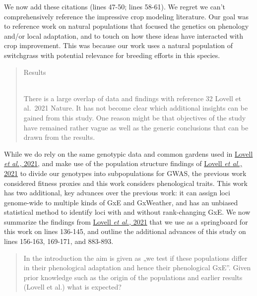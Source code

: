 \documentclass[
  letterpaper,
  DIV=11,
  numbers=noendperiod]{scrartcl}
\begin{document}
We now add these citations (lines 47-50; lines 58-61). We regret we
can't comprehensively reference the impressive crop modeling literature.
Our goal was to reference work on natural populations that focused the
genetics on phenology and/or local adaptation, and to touch on how these
ideas have interacted with crop improvement. This was because our work
uses a natural population of switchgrass with potential relevance for
breeding efforts in this species.

\begin{quote}
\begin{tcolorbox}[enhanced jigsaw, colframe=quarto-callout-warning-color-frame, rightrule=.15mm, leftrule=.75mm, left=2mm, breakable, toprule=.15mm, arc=.35mm, bottomrule=.15mm, opacityback=0, colback=white]

Results\\
\strut \\
There is a large overlap of data and findings with reference 32 Lovell
et al.~2021 Nature. It has not become clear which additional insights
can be gained from this study. One reason might be that objectives of
the study have remained rather vague as well as the generic conclusions
that can be drawn from the results.

\end{tcolorbox}
\end{quote}

While we do rely on the same genotypic data and common gardens used in
\href{https://doi.org/10.1038/s41586-020-03127-1}{Lovell \emph{et al.,}
2021}, and make use of the population structure findings of
\href{https://doi.org/10.1038/s41586-020-03127-1}{Lovell \emph{et al.,}
2021} to divide our genotypes into subpopulations for GWAS, the previous
work considered fitness proxies and this work considers phenological
traits. This work has two additional, key advances over the previous
work: it can assign loci genome-wide to multiple kinds of GxE and
GxWeather, and has an unbiased statistical method to identify loci with
and without rank-changing GxE. We now summarize the findings from
\href{https://doi.org/10.1038/s41586-020-03127-1}{Lovell \emph{et al.,}
2021} that we use as a springboard for this work on lines 136-145, and
outline the additional advances of this study on lines 156-163, 169-171,
and 883-893.

\begin{quote}
\begin{tcolorbox}[enhanced jigsaw, colframe=quarto-callout-warning-color-frame, rightrule=.15mm, leftrule=.75mm, left=2mm, breakable, toprule=.15mm, arc=.35mm, bottomrule=.15mm, opacityback=0, colback=white]

In the introduction the aim is given as „we test if these populations
differ in their phenological adaptation and hence their phenological
GxE''. Given prior knowledge such as the origin of the populations and
earlier results (Lovell et al.) what is expected?

\end{tcolorbox}
\end{quote}
\end{document}
